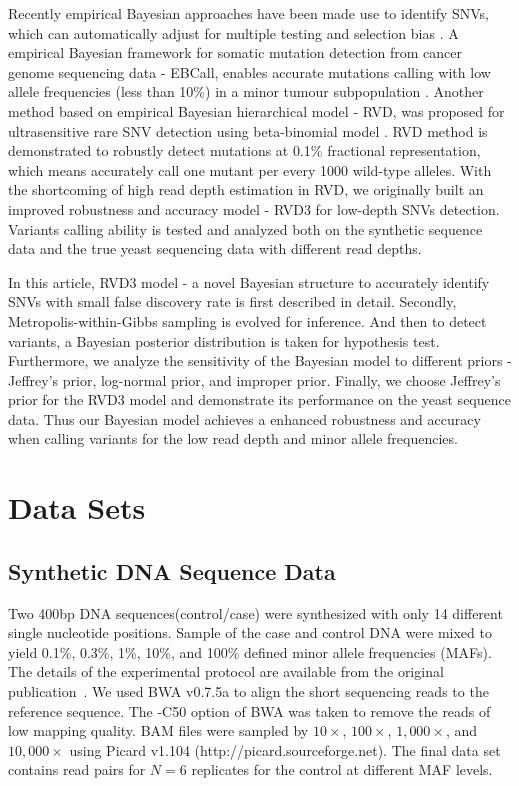 \documentclass[11pt,reqno]{amsart}
\begin{document}
Recently empirical Bayesian approaches have been made use to identify SNVs, which can automatically adjust for multiple testing and selection bias \citep{liao2014prior}.
A empirical Bayesian framework for somatic mutation detection from cancer genome sequencing data - EBCall, enables accurate mutations calling with low allele frequencies (less than 10\%) in a minor tumour subpopulation \citep{shiraishi2013empirical}.
Another method based on empirical Bayesian hierarchical model - RVD, was proposed for ultrasensitive rare SNV detection using beta-binomial model \citep{Flaherty:2011ja}.
RVD method is demonstrated to robustly detect mutations at 0.1\% fractional representation, which means accurately call one mutant per every 1000 wild-type alleles.
With the shortcoming of high read depth estimation in RVD, we originally built an improved robustness and accuracy model - RVD3 for low-depth SNVs detection.
Variants calling ability is tested and analyzed both on the synthetic sequence data and the true yeast sequencing data with different read depths.

In this article, RVD3 model - a novel Bayesian structure to accurately identify SNVs with small false discovery rate is first described in detail.
Secondly, Metropolis-within-Gibbs sampling is evolved for inference. And then to detect variants, a Bayesian posterior distribution is taken for hypothesis test.
Furthermore, we analyze the sensitivity of the Bayesian model to different priors - Jeffrey's prior, log-normal prior, and improper prior.
Finally, we choose Jeffrey's prior for the RVD3 model and demonstrate its performance on the yeast sequence data.
Thus our Bayesian model achieves a enhanced robustness and accuracy when calling variants for the low read depth and minor allele frequencies.

\section{Data Sets}

\subsection{Synthetic DNA Sequence Data}

Two 400bp DNA sequences(control/case) were synthesized with only 14 different single nucleotide positions. Sample of the case and control DNA were mixed to yield 0.1\%, 0.3\%, 1\%, 10\%, and 100\% defined minor allele frequencies (MAFs).
The details of the experimental protocol are available from the original publication~\citep{Flaherty:2011ja}.
We used BWA v0.7.5a to align the short sequencing reads to the reference sequence. The -C50 option of BWA was taken to remove the reads of low mapping quality.
BAM files were sampled by $10\times$, $100\times$, $1,000\times$, and $10,000\times$ using Picard v1.104 (http://picard.sourceforge.net).
The final data set contains read pairs for $N=6$ replicates for the control at different MAF levels.
\end{document}
